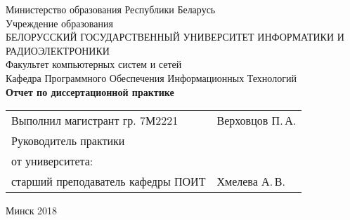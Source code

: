 \begin{titlepage}
    
    \begin{center}
        Министерство образования Республики Беларусь \\[0.4cm] 

        Учреждение образования \\

        \MakeUppercase{БЕЛОРУССКИЙ ГОСУДАРСТВЕННЫЙ УНИВЕРСИТЕТ ИНФОРМАТИКИ И РАДИОЭЛЕКТРОНИКИ} \\[0.4cm]

        Факультет компьютерных систем и сетей \\[0.4cm]

        Кафедра Программного Обеспечения Информационных Технологий \\[3.4cm] %

        {\large\bfseries{Отчет по диссертационной практике}} \\[2cm]
        \begin{tabular}{p{}p{} }
            Выполнил магистрант гр. 7М2221
            & Верховцов П.\,А. \\[1cm]

            Руководитель практики \\
            от университета: \\
            старший преподаватель кафедры ПОИТ
            & Хмелева А.\,В. \\
        \end{tabular}

       \vfill

        {\normalsize Минск 2018}
    \end{center}

\end{titlepage}